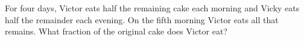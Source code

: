 For four days, Victor eats half the remaining cake each morning and Vicky eats half the remainder each evening. On the fifth morning Victor eats all that remains. What fraction of the original cake does Victor eat?
